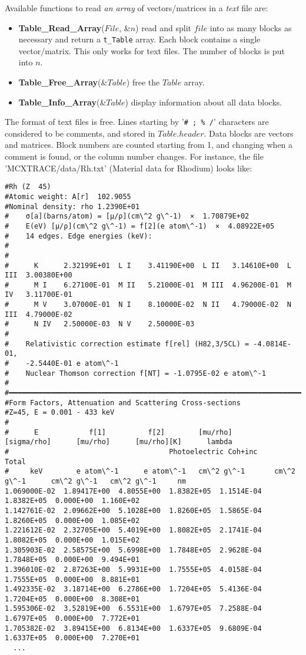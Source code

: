 Available functions to read \emph{an array} of vectors/matrices in a \emph{text} file are:
\begin{itemize}
\item {\bfseries Table\_Read\_Array}($File$, \&$n$) read and split $file$
into as many blocks as necessary and return a \verb+t_Table+ array.
Each block contains a single vector/matrix. This only works for text files.
The number of blocks is put into $n$.
\item {\bfseries Table\_Free\_Array}(\&$Table$) free the $Table$ array.
\item {\bfseries Table\_Info\_Array}(\&$Table$) display information about all data blocks.
\end{itemize}

The format of text files is free. Lines starting by '\verb+# ; % /+' characters are considered to be comments, and stored in $Table.header$. Data blocks are vectors and matrices. Block numbers are counted starting from 1, and changing when a comment is found, or the column number changes. For instance, the file 'MCXTRACE/data/Rh.txt' (Material data for Rhodium) looks like:
\begin{lstlisting}
#Rh (Z  45) 
#Atomic weight: A[r]  102.9055 
#Nominal density: rho 1.2390E+01
#    σ[a](barns/atom) = [μ/ρ](cm\^2 g\^-1)  ×  1.70879E+02
#    E(eV) [μ/ρ](cm\^2 g\^-1) = f[2](e atom\^-1)  ×  4.08922E+05
#    14 edges. Edge energies (keV):
#
#
#      K      2.32199E+01  L I    3.41190E+00  L II   3.14610E+00  L III  3.00380E+00
#      M I    6.27100E-01  M II   5.21000E-01  M III  4.96200E-01  M IV   3.11700E-01
#      M V    3.07000E-01  N I    8.10000E-02  N II   4.79000E-02  N III  4.79000E-02
#      N IV   2.50000E-03  N V    2.50000E-03
#
#    Relativistic correction estimate f[rel] (H82,3/5CL) = -4.0814E-01,
#    -2.5440E-01 e atom\^-1
#    Nuclear Thomson correction f[NT] = -1.0795E-02 e atom\^-1
#
#━━━━━━━━━━━━━━━━━━━━━━━━━━━━━━━━━━━━━━━━━━━━━━━━━━━━━━━━━━━━━━━━━━━━━━━━━━━━━━━
#Form Factors, Attenuation and Scattering Cross-sections
#Z=45, E = 0.001 - 433 keV
#
#      E            f[1]          f[2]        [mu/rho]      [sigma/rho]      [mu/rho]      [mu/rho][K]      lambda
#                                      Photoelectric Coh+inc      Total
#     keV        e atom\^-1      e atom\^-1   cm\^2 g\^-1       cm\^2 g\^-1      cm\^2 g\^-1   cm\^2 g\^-1     nm
1.069000E-02  1.89417E+00  4.8055E+00  1.8382E+05  1.1514E-04  1.8382E+05  0.000E+00  1.160E+02
1.142761E-02  2.09662E+00  5.1028E+00  1.8260E+05  1.5865E-04  1.8260E+05  0.000E+00  1.085E+02
1.221612E-02  2.32705E+00  5.4019E+00  1.8082E+05  2.1741E-04  1.8082E+05  0.000E+00  1.015E+02
1.305903E-02  2.58575E+00  5.6998E+00  1.7848E+05  2.9628E-04  1.7848E+05  0.000E+00  9.494E+01
1.396010E-02  2.87263E+00  5.9931E+00  1.7555E+05  4.0158E-04  1.7555E+05  0.000E+00  8.881E+01
1.492335E-02  3.18714E+00  6.2786E+00  1.7204E+05  5.4136E-04  1.7204E+05  0.000E+00  8.308E+01
1.595306E-02  3.52819E+00  6.5531E+00  1.6797E+05  7.2588E-04  1.6797E+05  0.000E+00  7.772E+01
1.705382E-02  3.89415E+00  6.8134E+00  1.6337E+05  9.6809E-04  1.6337E+05  0.000E+00  7.270E+01
  ...
\end{lstlisting}
